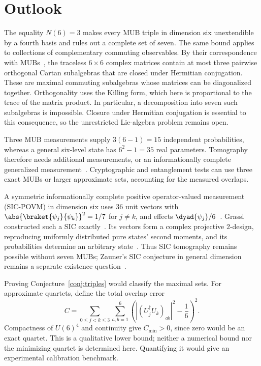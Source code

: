 \section{Outlook}
The equality $N(6)=3$ makes every MUB triple in dimension six unextendible by a fourth basis and rules out a complete set of seven. The same bound applies to collections of complementary commuting observables. By their correspondence with MUBs~\cite{Boykin2007}, the traceless $6\times6$ complex matrices contain at most three pairwise orthogonal Cartan subalgebras that are closed under Hermitian conjugation. These are maximal commuting subalgebras whose matrices can be diagonalized together. Orthogonality uses the Killing form, which here is proportional to the trace of the matrix product. In particular, a decomposition into seven such subalgebras is impossible. Closure under Hermitian conjugation is essential to this consequence, so the unrestricted Lie-algebra problem remains open.

Three MUB measurements supply $3(6-1)=15$ independent probabilities, whereas a general six-level state has $6^2-1=35$ real parameters. Tomography therefore needs additional measurements, or an informationally complete generalized measurement~\cite{WoottersFields1989,Scott2006}. Cryptographic and entanglement tests can use three exact MUBs or larger approximate sets, accounting for the measured overlaps.

A symmetric informationally complete positive operator-valued measurement (SIC-POVM) in dimension six uses $36$ unit vectors with $\abs{\braket{\psi_j}{\psi_k}}^2=1/7$ for $j\ne k$, and effects $\dyad{\psi_j}/6$~\cite{Renes2004}. Grassl constructed such a SIC exactly~\cite{Grassl2004}. Its vectors form a complex projective $2$-design, reproducing uniformly distributed pure states' second moments, and its probabilities determine an arbitrary state~\cite{Renes2004,Scott2006}. Thus SIC tomography remains possible without seven MUBs; Zauner's SIC conjecture in general dimension remains a separate existence question~\cite{Zauner1999}.

Proving Conjecture~\ref{conj:triples} would classify the maximal sets. For approximate quartets, define the total overlap error
\[
 C=\sum_{0\le j<k\le3}\sum_{a,b=1}^6
 \left(|(U_j^\dagger U_k)_{ab}|^2-\frac16\right)^2.
\]
Compactness of $U(6)^4$ and continuity give $C_{\min}>0$, since zero would be an exact quartet. This is a qualitative lower bound; neither a numerical bound nor the minimizing quartet is determined here. Quantifying it would give an experimental calibration benchmark.

